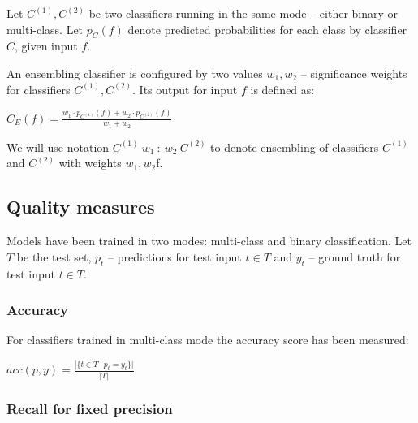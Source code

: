         Let $C^{(1)}, C^{(2)}$ be two classifiers running in the same mode -- either
        binary or multi-class.
        Let $p_{C}(f)$ denote predicted probabilities for each class by classifier $C$,
        given input $f$.

        An ensembling classifier is configured by two values $w_1, w_2$ -- significance
        weights for classifiers $C^{(1)}, C^{(2)}$. Its output for input $f$ is defined as:
        \begin{center}
        $C_{E}(f) = \frac{w_{1} \cdot p_{C^{(1)}}(f) + w_{2} \cdot p_{C^{(2)}}(f)}{w_{1} + w_{2}}$
        \end{center}

        We will use notation $C^{(1)}\ w_{1}\ :\ w_{2}\ C^{(2)}$ to denote ensembling
        of classifiers $C^{(1)}$ and $C^{(2)}$ with weights $w_{1}, w_{2}$f.


    \subsection{Quality measures}
        Models have been trained in two modes: multi-class and binary
        classification. Let $T$ be the test set, $p_t$ -- predictions for test input
        $t \in T$ and $y_t$ -- ground truth for test input $t \in T$.
        \subsubsection*{Accuracy}
        For classifiers trained in multi-class mode the accuracy score has been
        measured:

        \begin{center}
        $acc(p, y) = \frac{|\{t \in T\ |\ p_t = y_t\}|}{|T|}$
        \end{center}

        \subsubsection*{Recall for fixed precision}

